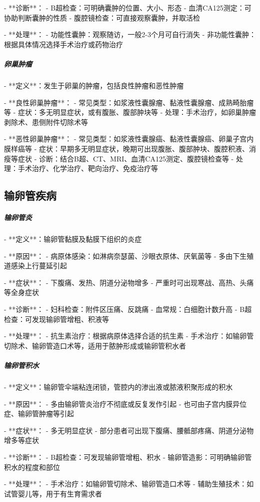 \begin{enumerate}
- **诊断**：
  - B超检查：可明确囊肿的位置、大小、形态
  - 血清CA125测定：可协助判断囊肿的性质
  - 腹腔镜检查：可直接观察囊肿，并取活检

- **处理**：
  - 功能性囊肿：观察随访，一般2-3个月可自行消失
  - 非功能性囊肿：根据具体情况选择手术治疗或药物治疗

\subparagraph{卵巢肿瘤}

- **定义**：发生于卵巢的肿瘤，包括良性肿瘤和恶性肿瘤

- **良性卵巢肿瘤**：
  - 常见类型：如浆液性囊腺瘤、黏液性囊腺瘤、成熟畸胎瘤等
  - 症状：多无明显症状，或有腹胀、腹部肿块等
  - 处理：手术治疗，如卵巢肿瘤剥除术、患侧附件切除术等

- **恶性卵巢肿瘤**：
  - 常见类型：如浆液性囊腺癌、黏液性囊腺癌、卵巢子宫内膜样癌等
  - 症状：早期多无明显症状，晚期可出现腹胀、腹部肿块、腹腔积液、消瘦等症状
  - 诊断：结合B超、CT、MRI、血清CA125测定、腹腔镜检查等
  - 处理：手术治疗、化学治疗、靶向治疗、免疫治疗等

\subsection{输卵管疾病}

\subparagraph{输卵管炎}

- **定义**：输卵管黏膜及黏膜下组织的炎症

- **原因**：
  - 病原体感染：如淋病奈瑟菌、沙眼衣原体、厌氧菌等
  - 多由下生殖道感染上行蔓延引起

- **症状**：
  - 下腹痛、发热、阴道分泌物增多
  - 严重时可出现寒战、高热、头痛等全身症状

- **诊断**：
  - 妇科检查：附件区压痛、反跳痛
  - 血常规：白细胞计数升高
  - B超检查：可发现输卵管增粗、积液等

- **处理**：
  - 抗生素治疗：根据病原体选择合适的抗生素
  - 手术治疗：如输卵管切除术、输卵管造口术等，适用于脓肿形成或输卵管积水者

\subparagraph{输卵管积水}

- **定义**：输卵管伞端粘连闭锁，管腔内的渗出液或脓液积聚形成的积水

- **原因**：
  - 多由输卵管炎治疗不彻底或反复发作引起
  - 也可由子宫内膜异位症、输卵管肿瘤等引起

- **症状**：
  - 多无明显症状
  - 部分患者可出现下腹痛、腰骶部疼痛、阴道分泌物增多等症状

- **诊断**：
  - B超检查：可发现输卵管增粗、积水
  - 输卵管造影：可明确输卵管积水的程度和部位

- **处理**：
  - 手术治疗：如输卵管切除术、输卵管造口术等
  - 辅助生殖技术：如试管婴儿等，用于有生育需求者


\end{enumerate}
